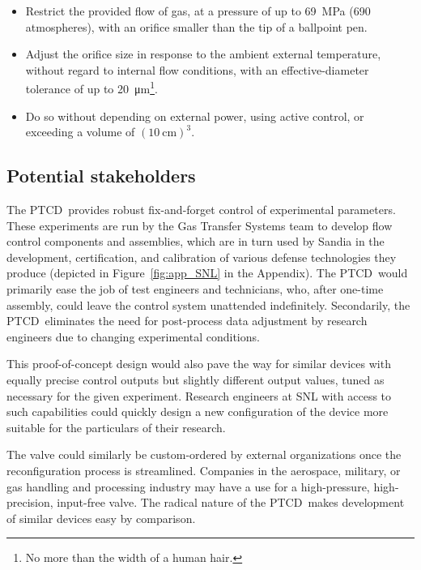 \documentclass[12pt, letterpaper]{report}%
\newcounter{mycounter}           %
\newcounter{sub}[mycounter]      %
\newcommand{\device}{PTCD}
\begin{document}
			\begin{itemize}
				\item Restrict the provided flow of gas, at a pressure of up to \SI{69}{\mega\pascal} (690 atmospheres), with an orifice smaller than the tip of a ballpoint pen.
				\item Adjust the orifice size in response to the ambient external temperature, without regard to internal flow conditions, with an effective-diameter tolerance of up to \SI{20}{\micro\meter}\footnote{No more than the width of a human hair\cite{ref_NIH}.}.
				\item Do so without depending on external power, using active control, or exceeding a volume of $(\SI{10}{\centi\meter})^3$.
			\end{itemize}
			
		\subsection{Potential stakeholders}
		\label{subsec:intro:motive:stakeholders}

			The \device\ provides robust fix-and-forget control of experimental parameters.
			These experiments are run by the Gas Transfer Systems team to develop flow control components and assemblies,
			which are in turn used by Sandia in the development, certification, and calibration of various defense technologies they produce
			(depicted in Figure~\ref{fig:app_SNL} in the Appendix).
			The \device\ would primarily ease the job of test engineers and technicians, who, after one-time assembly, could leave the control system unattended indefinitely.
			Secondarily, the \device\ eliminates the need for post-process data adjustment by research engineers due to changing experimental conditions.

			This proof-of-concept design would also pave the way for similar devices with equally precise control outputs but slightly different output values, tuned as necessary for the given experiment.
			Research engineers at SNL with access to such capabilities could quickly design a new configuration of the device more suitable for the particulars of their research.

			The valve could similarly be custom-ordered by external organizations once the reconfiguration process is streamlined.
			Companies in the aerospace, military, or gas handling and processing industry may have a use for a high-pressure, high-precision, input-free valve.
			The radical nature of the \device\ makes development of similar devices easy by comparison. 
\end{document}
